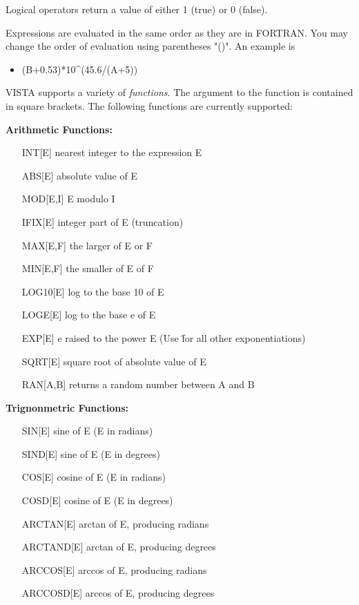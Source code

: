 Logical operators return a value of either 1 (true) or 0 (false).

Expressions are evaluated in the same order as they are in FORTRAN.  You
may change the order of evaluation using parentheses "()".  An example is
\begin{itemize}
  \item{(B+0.53)*10\^{ }(45.6/(A+5))}
\end{itemize}

VISTA supports a variety of \textit{functions}.  The argument to the
function is contained in square brackets.  The following functions are
currently supported:

\textbf{Arithmetic Functions:}
\begin{itemize}
  \item[INT{[E]}\hfill]{nearest integer to the expression E}
  \item[ABS{[E]}\hfill]{absolute value of E}
  \item[MOD{[E,I]}\hfill]{E modulo I}
  \item[IFIX{[E]}\hfill]{integer part of E (truncation)}
  \item[MAX{[E,F]}\hfill]{the larger of E or F}
  \item[MIN{[E,F]}\hfill]{the smaller of E of F}
  \item[LOG10{[E]}\hfill]{log to the base 10 of E}
  \item[LOGE{[E]}\hfill]{log to the base e of E}
  \item[EXP{[E]}\hfill]{e raised to the power E (Use \^ 
       for all other exponentiations)}
  \item[SQRT{[E]}\hfill]{square root of absolute value of E}
  \item[RAN{[A,B]}\hfill]{returns a random number between A and B}
\end{itemize}

\textbf{Trignonmetric Functions:}
\begin{itemize}
  \item[SIN{[E]}\hfill]{sine of E (E in radians)}
  \item[SIND{[E]}\hfill]{sine of E (E in degrees)}
  \item[COS{[E]}\hfill]{cosine of E (E in radians)}
  \item[COSD{[E]}\hfill]{cosine of E (E in degrees)}
  \item[ARCTAN{[E]}\hfill]{arctan of E, producing radians}
  \item[ARCTAND{[E]}\hfill]{arctan of E, producing degrees}
  \item[ARCCOS{[E]}\hfill]{arccos of E, producing radians}
  \item[ARCCOSD{[E]}\hfill]{arccos of E, producing degrees}
\end{itemize}


